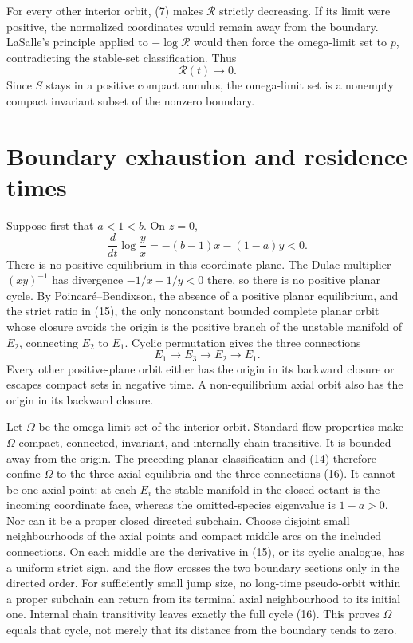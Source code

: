 \documentclass[10pt]{article}
\theoremstyle{remark}
\newcommand{\R}{\mathcal R}
\begin{document}
For every other interior orbit, (7) makes $\R$ strictly decreasing.  If its
limit were positive, the normalized coordinates would remain away from the
boundary.  LaSalle's principle applied to $-\log\R$ would then force the
omega-limit set to $p$, contradicting the stable-set classification.  Thus
\begin{equation}
                         \R(t)\longrightarrow0.
\end{equation}
Since $S$ stays in a positive compact annulus, the omega-limit set is a
nonempty compact invariant subset of the nonzero boundary.

\section{Boundary exhaustion and residence times}

Suppose first that $a<1<b$.  On $z=0$,
\begin{equation}
 \frac{d}{dt}\log\frac{y}{x}=-(b-1)x-(1-a)y<0.
\end{equation}
There is no positive equilibrium in this coordinate plane.  The Dulac
multiplier $(xy)^{-1}$ has divergence $-1/x-1/y<0$ there, so there is no
positive planar cycle.  By Poincar\'e--Bendixson, the absence of a positive
planar equilibrium, and the strict ratio in (15), the only nonconstant
bounded complete planar orbit whose closure avoids the origin is the positive
branch of the unstable manifold of $E_2$, connecting $E_2$ to $E_1$.
Cyclic permutation gives the three connections
\[
 E_1\longrightarrow E_3\longrightarrow E_2\longrightarrow E_1.
\]
Every other positive-plane orbit either has the origin in its backward
closure or escapes compact sets in negative time.  A non-equilibrium axial
orbit also has the origin in its backward closure.

Let $\Omega$ be the omega-limit set of the interior orbit.  Standard flow
properties make $\Omega$ compact, connected, invariant, and internally chain
transitive.  It is bounded away from the origin.  The preceding planar
classification and (14) therefore confine $\Omega$ to the three axial
equilibria and the three connections (16).  It cannot be one axial point:
at each $E_i$ the stable manifold in the closed octant is the incoming
coordinate face, whereas the omitted-species eigenvalue is $1-a>0$.  Nor can
it be a proper closed directed subchain.  Choose disjoint small
neighbourhoods of the axial points and compact middle arcs on the included
connections.  On each middle arc the derivative in (15), or its cyclic
analogue, has a uniform strict sign, and the flow crosses the two boundary
sections only in the directed order.  For sufficiently small jump size, no
long-time pseudo-orbit within a proper subchain can return from its terminal
axial neighbourhood to its initial one.  Internal chain transitivity leaves
exactly the full cycle (16).  This proves
$\Omega$ equals that cycle, not merely that its distance from the boundary
tends to zero.
\end{document}
